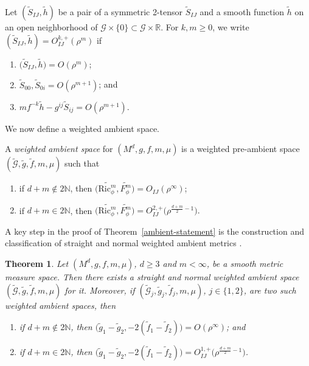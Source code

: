 \documentclass[11pt]{article}
\numberwithin{equation}{section}
\newcommand{\cg}{\widetilde{g}}
\newcommand{\cf}{\widetilde{f}}
\newcommand{\cmG}{\widetilde{\mathcal{G}}}
\newcommand{\bR}{\mathbb{R}}
\numberwithin{equation}{section}
\newtheorem{Theorem}{Theorem}[section]
\begin{document}
\begin{Definition}
Let $(\widetilde{S}_{IJ},\widetilde{h})$ be a pair of a symmetric 2-tensor $\widetilde{S}_{IJ}$ and a smooth function $\widetilde{h}$ on an open neighborhood of $\mathcal{G}\times \{0\}\subset\mathcal{G}\times \bR$. For $k,m\geq 0$, we write $(\widetilde{S}_{IJ},\widetilde{h})=O_{IJ}^{k,+}(\rho^m)$ if
\begin{enumerate}[label=$(\roman*)$]\itemsep=0pt
\item $\big(\widetilde{S}_{IJ},\widetilde{h}\big)=O(\rho^{m})$;
\item $\widetilde{S}_{00},\widetilde{S}_{0i}=O(\rho^{m+1})$; and
\item $m f^{-k}\widetilde{h}-g^{ij}\widetilde{S}_{ij}= O(\rho^{m+1})$.
\end{enumerate}
\end{Definition}

We now define a weighted ambient space.

\begin{Definition}
A \emph{weighted ambient space} for $(M^d,g,f,m,\mu)$ is a weighted pre-ambient space $(\cmG,\cg,\cf,m,\mu)$ such that
\begin{enumerate}[label=$(\roman*)$]\itemsep=0pt
\item if $d+m\notin 2\mathbb{N}$, then $\big(\widetilde{\mathrm{Ric}_\phi^m},\widetilde{F_\phi^m}\big)=O_{IJ}(\rho^{\infty})$;

\item if $d+m\in 2\mathbb{N}$, then $\big(\widetilde{\mathrm{Ric}_\phi^m},\widetilde{F_\phi^m}\big)=O^{2,+}_{IJ}\big(\rho^{\frac{d+m}{2}-1}\big).$
 \end{enumerate}
\end{Definition}

A key step in the proof of Theorem~\ref{ambient-statement} is the construction and classification of straight and normal weighted ambient metrics \cite{FeffermanGraham2012}.

\begin{Theorem}
 \label{weighted_ambient_metrics_exist}
 Let $(M^d,g,f,m,\mu)$, $d\geq 3$ and $m<\infty$, be a smooth metric measure space. Then there exists a straight and normal weighted ambient space $(\cmG,\cg,\cf,m,\mu)$ for it. Moreover, if $(\cmG_j,\cg_j,\cf_j,m,\mu)$, $j\in\{1,2\}$, are two such weighted ambient spaces, then
\begin{enumerate}[label=$(\roman*)$]\itemsep=0pt
 \item if $d+m\notin 2\mathbb{N}$, then $\big(\cg_1-\cg_2,-2(\cf_1-\cf_2)\big)=O(\rho^\infty)$; and
 \item if $d+m\in 2\mathbb{N}$, then $\big(\cg_1-\cg_2,-2(\cf_1-\cf_2)\big)=O_{IJ}^{1,+}\big(\rho^{\frac{d+m}{2}-1}\big)$.
 \end{enumerate}
\end{Theorem}
\end{document}
